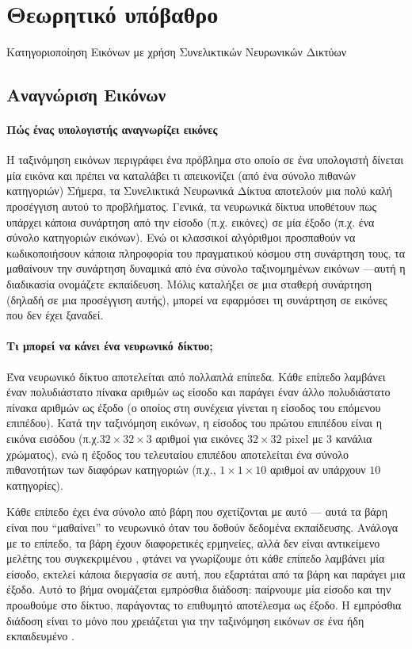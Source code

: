 \chapter{Θεωρητικό υπόβαθρο}
Κατηγοριοποίηση Εικόνων με χρήση Συνελικτικών Νευρωνικών Δικτύων  

\section{Αναγνώριση Εικόνων}
\subsubsection{Πώς ένας υπολογιστής αναγνωρίζει εικόνες\;}
Η ταξινόμηση εικόνων περιγράφει ένα πρόβλημα στο οποίο σε ένα υπολογιστή δίνεται μία εικόνα και πρέπει να καταλάβει τι απεικονίζει (από ένα σύνολο πιθανών κατηγοριών)
Σήμερα, τα Συνελικτικά Νευρωνικά Δίκτυα  αποτελούν  μια πολύ καλή  προσέγγιση αυτού το προβλήματος. Γενικά, τα νευρωνικά δίκτυα υποθέτουν πως υπάρχει κάποια συνάρτηση από την είσοδο (π.χ. εικόνες) σε μία έξοδο (π.χ. ένα σύνολο κατηγοριών εικόνων). Ενώ οι κλασσικοί αλγόριθμοι προσπαθούν να κωδικοποιήσουν  κάποια πληροφορία του πραγματικού κόσμου στη συνάρτηση τους, τα  μαθαίνουν την συνάρτηση δυναμικά  από ένα σύνολο ταξινομημένων εικόνων —αυτή η διαδικασία ονομάζετε εκπαίδευση. Μόλις καταλήξει σε μια σταθερή συνάρτηση (δηλαδή σε μια προσέγγιση αυτής), μπορεί να εφαρμόσει τη συνάρτηση σε εικόνες που δεν έχει ξαναδεί.

\subsubsection{Τι μπορεί να κάνει ένα νευρωνικό δίκτυο;}
Ένα νευρωνικό δίκτυο αποτελείται από πολλαπλά επίπεδα.  Κάθε επίπεδο λαμβάνει έναν πολυδιάστατο πίνακα αριθμών ως είσοδο και παράγει έναν άλλο πολυδιάστατο πίνακα αριθμών ως έξοδο (ο οποίος στη συνέχεια γίνεται η είσοδος του επόμενου επιπέδου). Κατά την ταξινόμηση εικόνων, η είσοδος του πρώτου επιπέδου είναι η εικόνα εισόδου  (π.χ.\( 32\times32\times3\) αριθμοί για εικόνες \(32\times32\) pixel με 3 κανάλια χρώματος), ενώ η έξοδος του τελευταίου επιπέδου αποτελείται  ένα σύνολο πιθανοτήτων των διαφόρων κατηγοριών (π.χ., \(1\times1\times10\) αριθμοί αν υπάρχουν \(10\) κατηγορίες).
 
Κάθε επίπεδο έχει ένα σύνολο από βάρη που σχετίζονται με αυτό — αυτά τα βάρη είναι που “μαθαίνει” το νευρωνικό όταν του δοθούν δεδομένα εκπαίδευσης. Ανάλογα με το επίπεδο, τα βάρη έχουν διαφορετικές ερμηνείες, αλλά δεν είναι αντικείμενο μελέτης του συγκεκριμένου , φτάνει να γνωρίζουμε ότι κάθε επίπεδο λαμβάνει μία είσοδο, εκτελεί κάποια διεργασία σε αυτή, που εξαρτάται από τα βάρη και παράγει μια έξοδο. Αυτό το βήμα ονομάζεται εμπρόσθια διάδοση: παίρνουμε μία είσοδο και την προωθούμε στο δίκτυο, παράγοντας το επιθυμητό αποτέλεσμα ως έξοδο. Η εμπρόσθια διάδοση είναι το μόνο που χρειάζεται για την ταξινόμηση εικόνων σε ένα ήδη εκπαιδευμένο .
 
